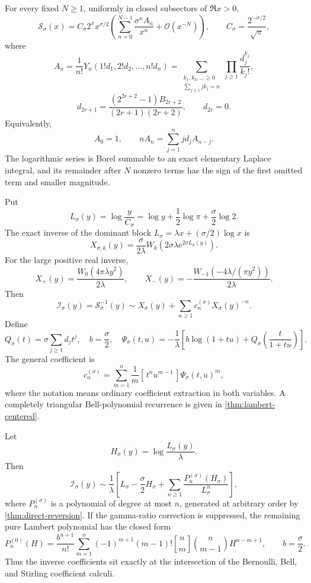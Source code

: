 \documentclass[11pt,a4paper]{article}
\numberwithin{equation}{section}
\theoremstyle{definition}
\theoremstyle{remark}
\newcommand{\e}{\mathrm e}
\newcommand{\Ord}{\mathcal O}
\newcommand{\Coeff}[1]{[\,#1\,]}
\newcommand{\BellY}{Y}
\newcommand{\StirlingFirst}[2]{\genfrac{[}{]}{0pt}{}{#1}{#2}}
\begin{document}
\begin{mainresultbox}
For every fixed \(N\ge1\), uniformly in closed subsectors of \(\Re x>0\),
\[
 \mathcal S_\sigma(x)
 =C_\sigma 2^x x^{\sigma/2}
 \left(\sum_{n=0}^{N-1}\frac{\sigma^n A_n}{x^n}
       +\Ord(x^{-N})\right),
 \qquad C_\sigma=\frac{2^{-\sigma/2}}{\sqrt\pi},
\]
where
\[
 A_n=\frac1{n!}\BellY_n(1!d_1,2!d_2,\ldots,n!d_n)
 =\sum_{\substack{k_1,k_2,\ldots\ge0\\
                   \sum_{j\ge1}jk_j=n}}
   \prod_{j\ge1}\frac{d_j^{k_j}}{k_j!},
\]
\[
 d_{2r+1}=\frac{(2^{2r+2}-1)B_{2r+2}}{(2r+1)(2r+2)},
 \qquad d_{2r}=0.
\]
Equivalently,
\[
 A_0=1,\qquad nA_n=\sum_{j=1}^n j d_jA_{n-j}.
\]
The logarithmic series is Borel summable to an exact elementary Laplace
integral, and its remainder after \(N\) nonzero terms has the sign of the
first omitted term and smaller magnitude.
\end{mainresultbox}

\begin{mainresultbox}
Put
\[
 L_\sigma(y)=\log\frac{y}{C_\sigma}
 =\log y+\frac12\log\pi+\frac\sigma2\log2.
\]
The exact inverse of the dominant block
\(L_\sigma=\lambda x+(\sigma/2)\log x\) is
\[
 X_{\sigma,k}(y)
 =\frac{\sigma}{2\lambda}
  W_k\!\left(2\sigma\lambda\e^{2\sigma L_\sigma(y)}\right).
\]
For the large positive real inverse,
\[
 X_+(y)=\frac{W_0(4\pi\lambda y^2)}{2\lambda},\qquad
 X_-(y)=-\frac{W_{-1}(-4\lambda/(\pi y^2))}{2\lambda}.
\]
Then
\[
 \mathcal I_\sigma(y)=\mathcal S_\sigma^{-1}(y)
 \sim X_\sigma(y)+\sum_{n\ge1}c_n^{(\sigma)}X_\sigma(y)^{-n}.
\]
Define
\[
 Q_\sigma(t)=\sigma\sum_{j\ge1}d_jt^j,
 \quad b=\frac\sigma2,
 \quad
 \Psi_\sigma(t,u)=-\frac1\lambda\left[
 b\log(1+tu)+Q_\sigma\!\left(\frac{t}{1+tu}\right)
 \right].
\]
The general coefficient is
\[
 c_n^{(\sigma)}
 =\sum_{m=1}^n\frac1m
   \Coeff{t^n u^{m-1}}\Psi_\sigma(t,u)^m,
\]
where the notation means ordinary coefficient extraction in both variables.
A completely triangular Bell-polynomial recurrence is given in
\cref{thm:lambert-centered}.
\end{mainresultbox}

\begin{mainresultbox}
Let
\[
 H_\sigma(y)=\log\frac{L_\sigma(y)}{\lambda}.
\]
Then
\[
 \mathcal I_\sigma(y)
 \sim\frac1\lambda\left[
 L_\sigma-\frac\sigma2H_\sigma+
 \sum_{n\ge1}\frac{P_n^{(\sigma)}(H_\sigma)}{L_\sigma^n}
 \right],
\]
where \(P_n^{(\sigma)}\) is a polynomial of degree at most \(n\), generated
at arbitrary order by \cref{thm:direct-reversion}.  If the gamma-ratio
correction is suppressed, the remaining pure Lambert polynomial has the
closed form
\[
 P_n^{(0)}(H)=
 \frac{b^{n+1}}{n!}
 \sum_{m=1}^n(-1)^{m+1}(m-1)!
 \StirlingFirst{n}{m}\binom{n}{m-1}H^{n-m+1},
 \qquad b=\frac\sigma2.
\]
Thus the inverse coefficients sit exactly at the intersection of the
Bernoulli, Bell, and Stirling coefficient calculi.
\end{mainresultbox}
\end{document}
